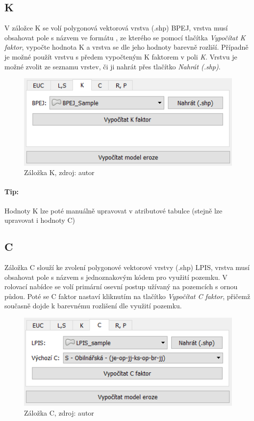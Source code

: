 \subsection{K} V záložce K se volí polygonová vektorová vrstva (.shp)
BPEJ, vrstva musí obsahovat pole s názvem  ve formátu
, ze kterého se pomocí tlačítka \textit{Vypočítat K
faktor}, vypočte hodnota K a vrstva se dle jeho hodnoty barevně
rozliší. Případně je možné použít vrstvu s předem vypočteným K
faktorem v poli \textit{K}. Vrstvu je možné zvolit ze seznamu vrstev,
či ji nahrát přes tlačítko \textit{Nahrát (.shp)}.
\begin{figure}[H] \centering
		\includegraphics[width=.6\textwidth]{./pictures/k.png}
		\caption[Záložka K]{Záložka K, zdroj: autor}
		\label{zalozka_k}
\end{figure}
\paragraph{Tip:} Hodnoty K lze poté manuálně upravovat v atributové
tabulce (stejně lze upravovat i hodnoty C)
\subsection{C} Záložka C slouží ke zvolení polygonové vektorové vrstvy
(.shp) LPIS, vrstva musí obsahovat pole s názvem  s
jednoznakovým kódem pro využití pozemku. V rolovací nabídce se volí
primární osevní postup užívaný na pozemcích s ornou půdou. Poté se C
faktor nastaví kliknutím na tlačítko \textit{Vypočítat C faktor},
přičemž současně dojde k barevnému rozlišení dle využití pozemku.
\begin{figure}[H] \centering
		\includegraphics[width=.6\textwidth]{./pictures/c.png}
		\caption[Záložka C]{Záložka C, zdroj: autor}
		\label{zalozka_c}
\end{figure}
